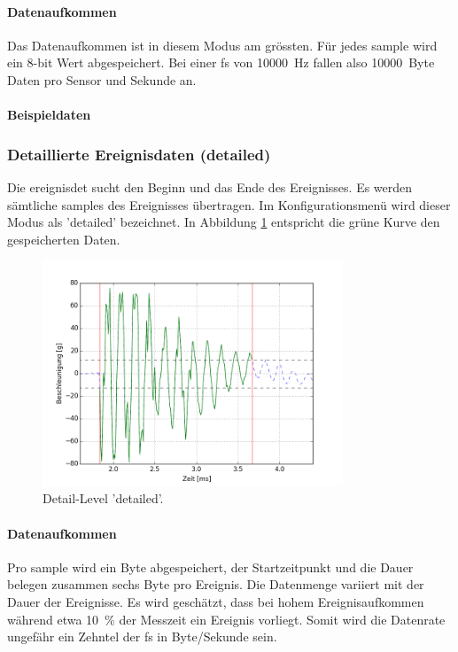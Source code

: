 \paragraph{Datenaufkommen} Das Datenaufkommen ist in diesem Modus am grössten. Für jedes \gls{sample} wird ein 8-bit Wert abgespeichert. Bei einer \gls{fs} von 10000~Hz fallen also 10000~Byte Daten pro Sensor und Sekunde an.

\paragraph{Beispieldaten} 

\subsubsection{Detaillierte Ereignisdaten (detailed)}
Die \gls{ereignisdet} sucht den Beginn und das Ende des Ereignisses. Es werden sämtliche \glspl{sample} des Ereignisses übertragen. Im Konfigurationsmenü wird dieser Modus als 'detailed' bezeichnet. In Abbildung \ref{fig.detaildetailed} entspricht die grüne Kurve den gespeicherten Daten.

\begin{figure}
	\centering
		\includegraphics[width=0.8\textwidth]{images/detailed.png}
	\caption{Detail-Level 'detailed'.}
	\label{fig.detaildetailed}
\end{figure}

\paragraph{Datenaufkommen} Pro \gls{sample} wird ein Byte abgespeichert, der Startzeitpunkt und die Dauer belegen zusammen sechs Byte pro Ereignis. Die Datenmenge variiert mit der Dauer der Ereignisse. Es wird geschätzt, dass bei hohem Ereignisaufkommen während etwa 10~\% der Messzeit ein Ereignis vorliegt. Somit wird die Datenrate ungefähr ein Zehntel der \gls{fs} in Byte/Sekunde sein.

